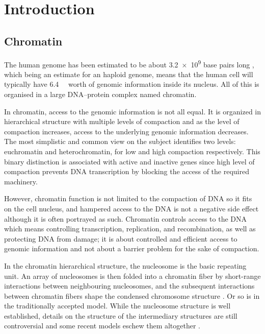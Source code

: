\chapter{Introduction}

\section{Chromatin}

  The human genome has been estimated to be about \num{3.2e9}
  base pairs long \citep{nature-first-human-genome-draft}, which
  being an estimate for an haploid genome, means that the human cell will
  typically have \SI{6.4}{\giga\bp} worth of genomic information inside
  its nucleus.
  All of this is organised in a large DNA--protein complex named chromatin.

  In chromatin, access to the genomic information is not all equal.
  It is organized in hierarchical structure with
  multiple levels of compaction  and
  as the level of compaction increases, access to the underlying genomic
  information decreases.
  The most simplistic and common view on the subject
  identifies two levels: euchromatin and heterochromatin, for low and
  high compaction respectively.
  This binary distinction is associated with active and inactive genes
  since high level of compaction prevents DNA transcription by blocking
  the access of the required machinery.

  However, chromatin function is not limited to the compaction of DNA
  so it fits on the
  cell nucleus, and hampered access to the DNA is not a negative side
  effect although it is often portrayed as such.
  Chromatin controls access
  to the DNA which means controlling transcription, replication,
  and recombination, as
  well as protecting DNA from damage;  it is about controlled and efficient
  access to genomic information and not about a barrier problem for the sake
  of compaction.

  In the chromatin hierarchical structure, the nucleosome is the
  basic repeating unit.
  An array of nucleosomes is then folded into a chromatin fiber by
  short-range interactions between neighbouring nucleosomes,
  and the subsequent interactions between chromatin fibers shape the
  condensed chromosome structure .
  Or so is in the traditionally accepted model.  While the nucleosome
  structure is well established, details on the structure of the
  intermediary structures are still controversial and some recent models
  eschew them altogether
  \citep{fussner2011-no-30nm-fibre, luger2012-chromatin-review}.

